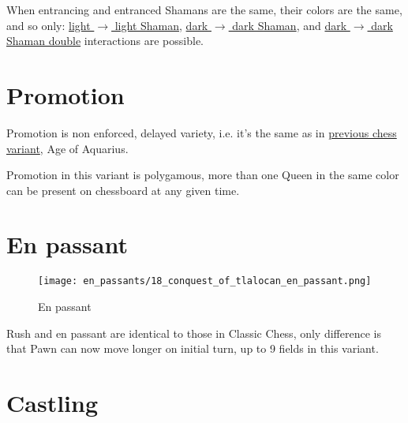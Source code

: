 When entrancing and entranced Shamans are the same, their colors are the same, and so only: \newline
\hyperref[fig:scn_cot_16_light_light_shaman_interaction_start]{light $\rightarrow$ light Shaman}, \newline
\hyperref[fig:scn_cot_20_dark_dark_shaman_interaction_start]{dark $\rightarrow$ dark Shaman}, and \newline
\hyperref[fig:scn_cot_22_dark_dark_shaman_double_interaction_start]{dark $\rightarrow$ dark Shaman double}
interactions are possible.

\clearpage %

\section*{Promotion}

Promotion is non enforced, delayed variety, i.e. it's the same as in
\hyperref[sec:Age of Aquarius/Promotion]{previous chess variant}, Age of Aquarius.

Promotion in this variant is polygamous, more than one Queen in the same color
can be present on chessboard at any given time.

\clearpage %

\section*{En passant}

\noindent
\begin{wrapfigure}{l}{0.4\textwidth}
\centering
\texttt{[image: en\_passants/18\_conquest\_of\_tlalocan\_en\_passant.png]}
\caption{En passant}
\label{fig:18_conquest_of_tlalocan_en_passant}
\end{wrapfigure}
Rush and en passant are identical to those in Classic Chess, only difference
is that Pawn can now move longer on initial turn, up to 9 fields in this
variant.

\clearpage %

\section*{Castling}


